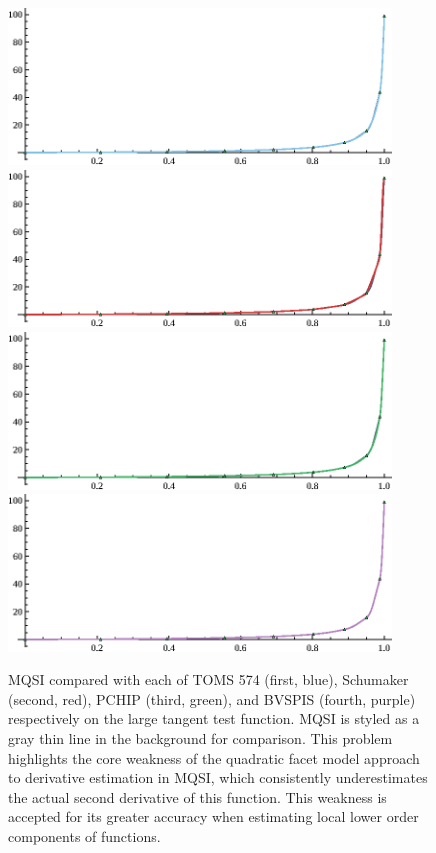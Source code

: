 \begin{figure}[h]
  \centering
\includegraphics[width=4in]{vis/comparisons/large-tangent/1-toms574.eps}
\includegraphics[width=4in]{vis/comparisons/large-tangent/2-schumaker.eps}
\includegraphics[width=4in]{vis/comparisons/large-tangent/3-pchip.eps}
\includegraphics[width=4in]{vis/comparisons/large-tangent/4-bvspis.eps}
\caption{ %
{\ttVIII MQSI} compared with each of TOMS 574 (first, blue), Schumaker
(second, red), {\ttVIII PCHIP} (third, green), and {\ttVIII BVSPIS}
(fourth, purple) respectively on the {\itVIII large tangent} test
function. {\ttVIII MQSI} is styled as a gray thin line in the
background for comparison. This problem highlights the core weakness
of the quadratic facet model approach to derivative estimation in
{\ttVIII MQSI}, which consistently underestimates the actual
second derivative of this function. This weakness is accepted
for its greater accuracy when estimating local lower order components
of functions.}
\end{figure}

